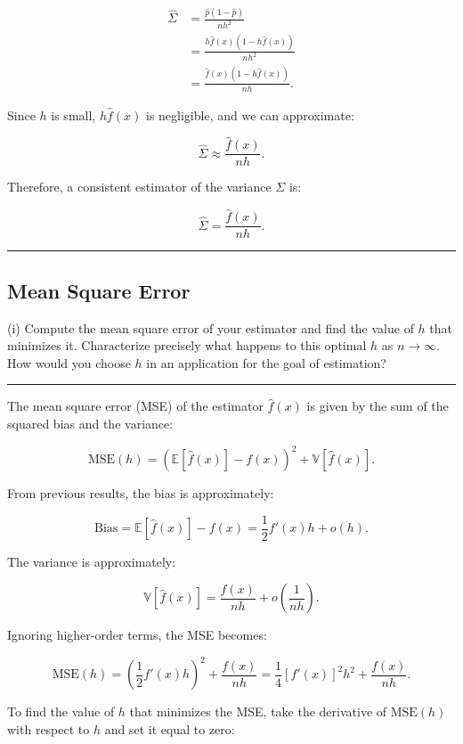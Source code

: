 \documentclass{article}
\newenvironment{colorparagraph}[1]{\par\color{#1}}{\par}
\begin{document}
\[
\begin{aligned}
\hat{\Sigma} &= \frac{\hat{p} (1 - \hat{p})}{n h^2} \\
&= \frac{h \hat{f}(x) \left( 1 - h \hat{f}(x) \right)}{n h^2} \\
&= \frac{\hat{f}(x) \left( 1 - h \hat{f}(x) \right)}{n h}.
\end{aligned}
\]

Since \( h \) is small, \( h \hat{f}(x) \) is negligible, and we can approximate:

\[
\hat{\Sigma} \approx \frac{\hat{f}(x)}{n h}.
\]

Therefore, a consistent estimator of the variance \( \Sigma \) is:

\[
\hat{\Sigma} = \frac{\hat{f}(x)}{n h}.
\]

\begin{colorparagraph}{questioncolor}
\label{q2i}
\rule{\textwidth}{0.5pt}
\subsection{Mean Square Error}
(i) Compute the mean square error of your estimator and find the value of \( h \) that minimizes it. Characterize precisely what happens to this optimal \( h \) as \( n \to \infty \). How would you choose \( h \) in an application for the goal of estimation?

\rule{\textwidth}{0.5pt}
\end{colorparagraph}

The mean square error (MSE) of the estimator \( \hat{f}(x) \) is given by the sum of the squared bias and the variance:

\[
\text{MSE}(h) = \left( \mathbb{E}[\hat{f}(x)] - f(x) \right)^2 + \mathbb{V}[\hat{f}(x)].
\]

From previous results, the bias is approximately:

\[
\text{Bias} = \mathbb{E}[\hat{f}(x)] - f(x) = \frac{1}{2} f'(x) h + o(h).
\]

The variance is approximately:

\[
\mathbb{V}[\hat{f}(x)] = \frac{f(x)}{n h} + o\left( \frac{1}{n h} \right).
\]

Ignoring higher-order terms, the MSE becomes:

\[
\text{MSE}(h) = \left( \frac{1}{2} f'(x) h \right)^2 + \frac{f(x)}{n h} = \frac{1}{4} [f'(x)]^2 h^2 + \frac{f(x)}{n h}.
\]

To find the value of \( h \) that minimizes the MSE, take the derivative of \( \text{MSE}(h) \) with respect to \( h \) and set it equal to zero:
\end{document}

